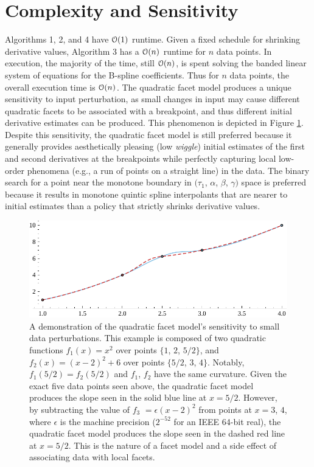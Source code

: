 \section{Complexity and Sensitivity}

Algorithms 1, 2, and 4 have ${\cal O}(1)$ runtime. Given a fixed
schedule for shrinking derivative values, Algorithm 3 has a ${\cal
  O}(n)$ runtime for $n$ data points. In execution, the majority of
the time, still ${\cal O}(n)$, is spent solving the banded linear
system of equations for the B-spline coefficients. Thus for $n$ data
points, the overall execution time is ${\cal O}(n)$. The quadratic
facet model produces a unique sensitivity to input perturbation, as
small changes in input may cause different quadratic facets to be
associated with a breakpoint, and thus different initial derivative
estimates can be produced. This phenomenon is depicted in Figure
\ref{splines:fig-1}. Despite this sensitivity, the quadratic facet model is still
preferred because it generally provides aesthetically pleasing (low
{\it wiggle}) initial estimates of the first and second derivatives at
the breakpoints while perfectly capturing local low-order phenomena
(e.g., a run of points on a straight line) in the data. The binary
search for a point near the monotone boundary in $(\tau_1$, $\alpha$,
$\beta$, $\gamma)$ space is preferred because it results in monotone
quintic spline interpolants that are nearer to initial estimates than
a policy that strictly shrinks derivative values.

\begin{figure}
  \centering
  \includegraphics[width=.8\textwidth]{Figures/TOMS/1-sensitivity.pdf}
  \caption{A demonstration of the quadratic
  facet model's sensitivity to small data perturbations. This example is
  composed of two quadratic functions $f_1(x) = x^2$ over points $\{1$,
  $2$, $5/2\}$, and $f_2(x) = (x-2)^2 + 6$ over points $\{5/2$, $3$,
  $4\}$. Notably, $f_1(5/2) = f_2(5/2)$ and $f_1$, $f_2$ have the same
  curvature. Given the exact five data points seen above, the quadratic
  facet model produces the slope seen in the solid blue line at $x = 5/2$.
  However, by subtracting the value of $f_3$ $= \epsilon(x-2)^2$ from
  points at $x = 3$, $4$, where $\epsilon$ is the machine precision
  ($2^{-52}$ for an IEEE 64-bit real), the quadratic facet model produces
  the slope seen in the dashed red line at $x = 5/2$. This is the nature
  of a facet model and a side effect of associating data with local facets.}
  \label{splines:fig-1}
\end{figure}


